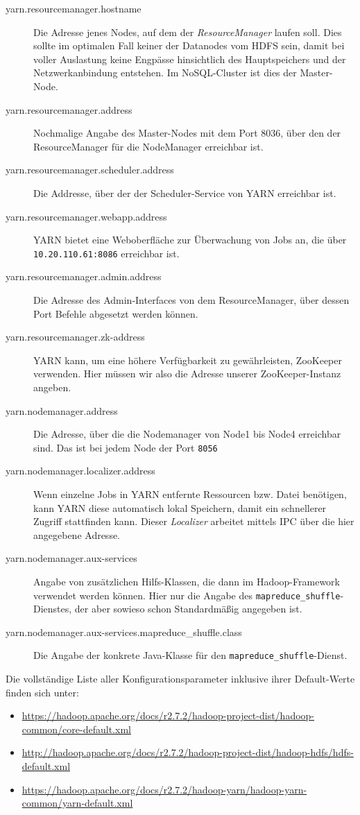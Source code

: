 \begin{description}
	\item[yarn.resourcemanager.hostname] Die Adresse jenes Nodes, auf dem der \textit{ResourceManager} laufen soll.
	Dies sollte im optimalen Fall keiner der Datanodes vom HDFS sein, damit bei voller Auslastung keine Engpässe hinsichtlich
	des Hauptspeichers und der Netzwerkanbindung entstehen. Im NoSQL-Cluster ist dies der Master-Node.
	\item[yarn.resourcemanager.address] Nochmalige Angabe des Master-Nodes mit dem Port 8036, über den der
	ResourceManager für die NodeManager erreichbar ist.
	\item[yarn.resourcemanager.scheduler.address] Die Addresse, über der der Scheduler-Service von YARN erreichbar ist.
	\item[yarn.resourcemanager.webapp.address] YARN bietet eine Weboberfläche zur Überwachung von Jobs an, die über \texttt{10.20.110.61:8086} 
	erreichbar ist.
	\item[yarn.resourcemanager.admin.address] Die Adresse des Admin-Interfaces von dem ResourceManager, über dessen Port Befehle abgesetzt werden können.
	\item[yarn.resourcemanager.zk-address] YARN kann, um eine höhere Verfügbarkeit zu gewährleisten, ZooKeeper verwenden. Hier müssen wir also die Adresse unserer
	ZooKeeper-Instanz angeben.
	\item[yarn.nodemanager.address] Die Adresse, über die die Nodemanager von Node1 bis Node4 erreichbar sind. Das ist bei jedem Node der Port \texttt{8056}
	\item[yarn.nodemanager.localizer.address] Wenn einzelne Jobs in YARN entfernte Ressourcen bzw. Datei benötigen, kann YARN diese automatisch lokal Speichern,
	damit ein schnellerer Zugriff stattfinden kann. Dieser \textit{Localizer} arbeitet mittels IPC über die hier angegebene Adresse.
	\item[yarn.nodemanager.aux-services] Angabe von zusätzlichen Hilfs-Klassen, die dann im Hadoop-Framework verwendet werden können. Hier nur die Angabe des \texttt{mapreduce\_shuffle}-Dienstes, der aber sowieso schon Standardmäßig angegeben ist.
	\item[yarn.nodemanager.aux-services.mapreduce\_shuffle.class] Die Angabe der konkrete Java-Klasse für den \texttt{mapreduce\_shuffle}-Dienst.
\end{description}

Die vollständige Liste aller Konfigurationsparameter inklusive ihrer Default-Werte finden sich unter:

\begin{itemize}
	\item \url{https://hadoop.apache.org/docs/r2.7.2/hadoop-project-dist/hadoop-common/core-default.xml}
	\item \url{http://hadoop.apache.org/docs/r2.7.2/hadoop-project-dist/hadoop-hdfs/hdfs-default.xml}
	\item \url{https://hadoop.apache.org/docs/r2.7.2/hadoop-yarn/hadoop-yarn-common/yarn-default.xml}
\end{itemize}
